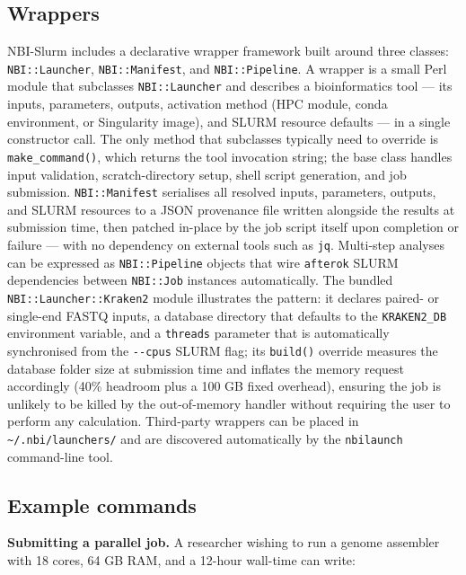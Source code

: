 \documentclass[
]{article}
\begin{document}
\subsection{Wrappers}\label{wrappers}

NBI-Slurm includes a declarative wrapper framework built around three
classes: \texttt{NBI::Launcher}, \texttt{NBI::Manifest}, and
\texttt{NBI::Pipeline}. A wrapper is a small Perl module that subclasses
\texttt{NBI::Launcher} and describes a bioinformatics tool --- its
inputs, parameters, outputs, activation method (HPC module, conda
environment, or Singularity image), and SLURM resource defaults --- in a
single constructor call. The only method that subclasses typically need
to override is \texttt{make\_command()}, which returns the tool
invocation string; the base class handles input validation,
scratch-directory setup, shell script generation, and job submission.
\texttt{NBI::Manifest} serialises all resolved inputs, parameters,
outputs, and SLURM resources to a JSON provenance file written alongside
the results at submission time, then patched in-place by the job script
itself upon completion or failure --- with no dependency on external
tools such as \texttt{jq}. Multi-step analyses can be expressed as
\texttt{NBI::Pipeline} objects that wire \texttt{afterok} SLURM
dependencies between \texttt{NBI::Job} instances automatically. The
bundled \texttt{NBI::Launcher::Kraken2} module illustrates the pattern:
it declares paired- or single-end FASTQ inputs, a database directory
that defaults to the \texttt{KRAKEN2\_DB} environment variable, and a
\texttt{threads} parameter that is automatically synchronised from the
\texttt{-\/-cpus} SLURM flag; its \texttt{build()} override measures the
database folder size at submission time and inflates the memory request
accordingly (40\% headroom plus a 100 GB fixed overhead), ensuring the
job is unlikely to be killed by the out-of-memory handler without
requiring the user to perform any calculation. Third-party wrappers can
be placed in \texttt{\textasciitilde{}/.nbi/launchers/} and are
discovered automatically by the \texttt{nbilaunch} command-line tool.

\subsection{Example commands}\label{example-commands}

\textbf{Submitting a parallel job.} A researcher wishing to run a genome
assembler with 18 cores, 64 GB RAM, and a 12-hour wall-time can write:
\end{document}
